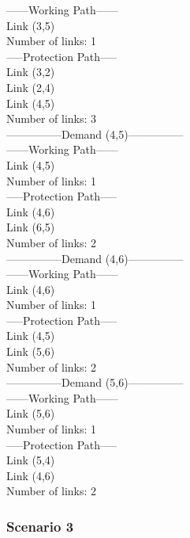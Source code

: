 ------Working Path------ \\
Link  (3,5) \\
Number of links: 1 \\

-----Protection Path----- \\
Link  (3,2) \\
Link  (2,4) \\
Link  (4,5) \\
Number of links: 3 \\


---------------Demand (4,5)--------------- \\

------Working Path------ \\
Link  (4,5) \\
Number of links: 1 \\

-----Protection Path----- \\
Link  (4,6) \\
Link  (6,5) \\
Number of links: 2 \\


---------------Demand (4,6)--------------- \\

------Working Path------ \\
Link  (4,6) \\
Number of links: 1 \\

-----Protection Path----- \\
Link  (4,5) \\
Link  (5,6) \\
Number of links: 2 \\


---------------Demand (5,6)--------------- \\

------Working Path------ \\
Link  (5,6) \\
Number of links: 1 \\

-----Protection Path----- \\
Link  (5,4) \\
Link  (4,6) \\
Number of links: 2 \\

\subsubsection{Scenario 3}

